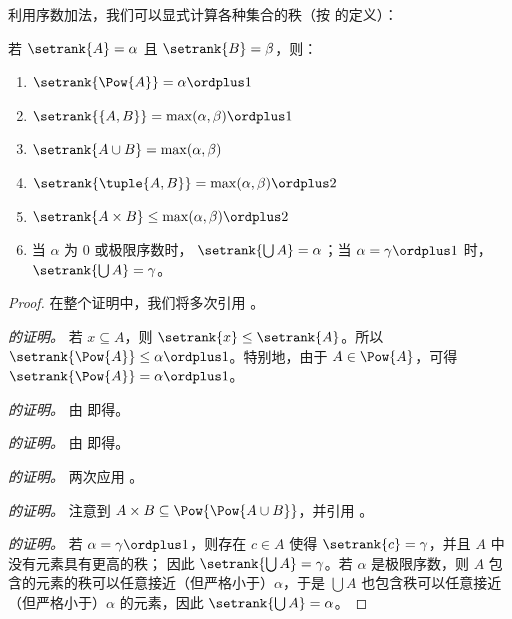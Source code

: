 \documentclass[../../../include/open-logic-section]{subfiles}
\begin{document}

利用序数加法，我们可以显式计算各种集合的秩（按
 的定义）：


\begin{lem}
若 $\setrank{A} = \alpha$ 且 $\setrank{B} = \beta$，则：
\begin{enumerate}
	\item{} $\setrank{\Pow{A}} = \alpha\ordplus 1$
	\item{} $\setrank{\{A, B\}} = \max(\alpha,
	\beta) \ordplus 1$
	\item{} $\setrank{A \cup B} = \max(\alpha,
	\beta)$
	\item{} $\setrank{\tuple{A,B}} = \max(\alpha,
	\beta) \ordplus  2$
	\item{} $\setrank{A \times B} \leq \max(\alpha,
	\beta) \ordplus  2$
	\item{} 当 $\alpha$ 为 0 或极限序数时，
	$\setrank{\bigcup A} = \alpha$；当 $\alpha = \gamma\ordplus 1$ 时，
	$\setrank{\bigcup A} = \gamma$。
\end{enumerate}
\end{lem}

\begin{proof}
在整个证明中，我们将多次引用 。

\emph{ 的证明。} 若 $x \subseteq A$，则 $\setrank{x} \leq
\setrank{A}$。所以 $\setrank{\Pow{A}} \leq \alpha \ordplus  1$。特别地，由于 $A
\in \Pow{A}$，可得 $\setrank{\Pow{A}} = \alpha \ordplus  1$。

\emph{ 的证明。} 由  即得。

\emph{ 的证明。} 由  即得。

\emph{ 的证明。} 两次应用 。

\emph{ 的证明。} 注意到 $A \times B \subseteq
\Pow{\Pow{A \cup B}}$，并引用 。

\emph{ 的证明。} 若 $\alpha = \gamma\ordplus 1$，则存在
$c \in A$ 使得 $\setrank{c} = \gamma$，并且 $A$ 中没有元素具有更高的秩；
因此 $\setrank{\bigcup A} = \gamma$。若 $\alpha$ 是极限序数，则 $A$ 包含的元素的秩可以任意接近（但严格小于）$\alpha$，于是 $\bigcup A$ 也包含秩可以任意接近（但严格小于）$\alpha$ 的元素，因此 $\setrank{\bigcup A} = \alpha$。
\end{proof}
\end{document}
